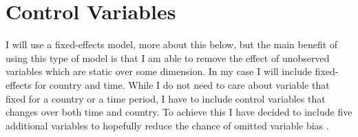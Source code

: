 \begin{table}[H]
\centering
\caption{Components of the FBIC index}
\label{tab:fbic}
\vspace{0.5em}
\end{table}

\section{Control Variables} \label{control}
I will use a fixed-effects model, more about this below, but the main benefit of using this type of model is that I am able to remove the effect of unobserved variables which are static over some dimension. In my case I will include fixed-effects for country and time. While I do not need to care about variable that fixed for a country or a time period,  I have to include control variables that changes over both time and country. To achieve this I have decided to include five additional variables to hopefully reduce the chance of omitted variable bias \citep[pp. 81-85]{wooldridge_econometric_2010}.

